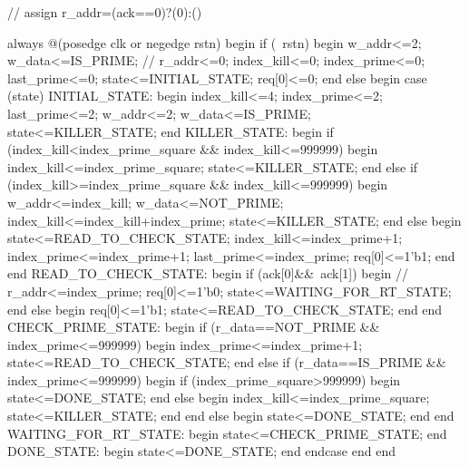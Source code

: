 \documentclass[a4paper]{article}
\begin{document}
\begin{tcblisting}
        // assign r_addr=(ack==0)?(0):()

        always @(posedge clk or negedge rstn) begin
            if (~rstn) begin
                w_addr<=2;
                w_data<=IS_PRIME;
                // r_addr<=0;
                index_kill<=0;
                index_prime<=0;
                last_prime<=0;
                state<=INITIAL_STATE;
                req[0]<=0;
            end else begin
                case (state)
                    INITIAL_STATE: begin
                        index_kill<=4;
                        index_prime<=2;
                        last_prime<=2;
                        w_addr<=2;
                        w_data<=IS_PRIME;
                        state<=KILLER_STATE;
                    end
                    KILLER_STATE: begin
                        if (index_kill<index_prime_square && index_kill<=999999) begin
                            index_kill<=index_prime_square;
                            state<=KILLER_STATE;
                        end else if (index_kill>=index_prime_square && index_kill<=999999) begin
                            w_addr<=index_kill;
                            w_data<=NOT_PRIME;
                            index_kill<=index_kill+index_prime;
                            state<=KILLER_STATE;
                        end else begin
                            state<=READ_TO_CHECK_STATE;
                            index_kill<=index_prime+1;
                            index_prime<=index_prime+1;
                            last_prime<=index_prime;
                            req[0]<=1'b1;
                        end
                    end
                    READ_TO_CHECK_STATE: begin
                        if (ack[0]&&~ack[1]) begin
                            // r_addr<=index_prime;
                            req[0]<=1'b0;
                            state<=WAITING_FOR_RT_STATE;
                        end else begin
                            req[0]<=1'b1;
                            state<=READ_TO_CHECK_STATE;
                        end
                    end
                    CHECK_PRIME_STATE: begin
                        if (r_data==NOT_PRIME && index_prime<=999999) begin
                            index_prime<=index_prime+1;
                            state<=READ_TO_CHECK_STATE;
                        end else if (r_data==IS_PRIME && index_prime<=999999) begin
                            if (index_prime_square>999999) begin
                                state<=DONE_STATE;
                            end else begin
                                index_kill<=index_prime_square;
                                state<=KILLER_STATE;
                            end
                        end else begin
                            state<=DONE_STATE;
                        end
                    end
                    WAITING_FOR_RT_STATE: begin
                        state<=CHECK_PRIME_STATE;
                    end
                    DONE_STATE: begin
                        state<=DONE_STATE;
                    end
                endcase
            end
        end


\end{tcblisting}
\end{document}
